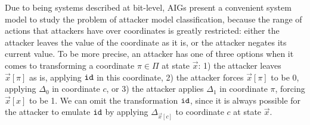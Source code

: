 Due to being systems described at bit-level, AIGs present a convenient system model to study the problem of attacker model classification, because the range of actions that attackers have over coordinates is greatly restricted: either the attacker leaves the value of the coordinate as it is, or the attacker negates its current value. To be more precise, an attacker has one of three options when it comes to transforming a coordinate $\pi\in \Pi$ at state $\vec{x}$: 1) the attacker leaves $\vec{x}[\pi]$ as is, applying ${\texttt{id}}$ in this coordinate, 2) the attacker forces $\vec{x}[\pi]$ to be 0, applying $\Delta_0$ in coordinate $c$, or 3) the attacker applies $\Delta_1$ in coordinate $\pi$, forcing $\vec{x}[x]$ to be 1. We can omit the transformation ${\texttt{id}}$, since it is always possible for the attacker to emulate ${\texttt{id}}$ by applying $\Delta_{\vec{x}[c]}$ to coordinate $c$ at state $\vec{x}$.





